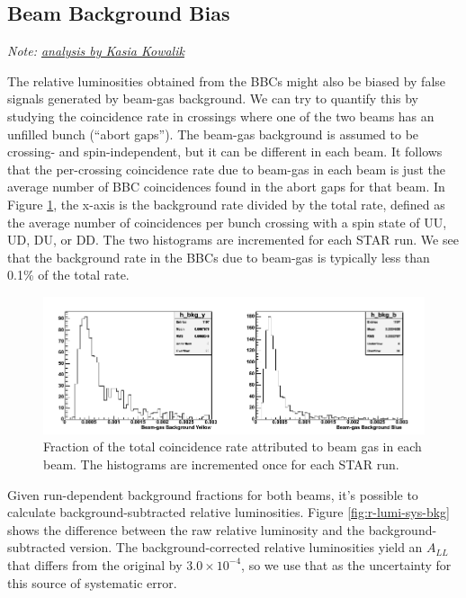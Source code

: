 \subsection{Beam Background Bias}

\textit{Note: \href{http://www.star.bnl.gov/protected/spin/kowalik/2005/r-lumi/bkg_sys.html}{analysis by Kasia Kowalik}}

The relative luminosities obtained from the BBCs might also be biased by false signals generated by beam-gas background.  We can try to quantify this by studying the coincidence rate in crossings where one of the two beams has an unfilled bunch (``abort gaps'').  The beam-gas background is assumed to be crossing- and spin-independent, but it can be different in each beam.  It follows that the per-crossing coincidence rate due to beam-gas in each beam is just the average number of BBC coincidences found in the abort gaps for that beam.  In Figure \ref{fig:bkg-yellow-blue}, the x-axis is the background rate divided by the total rate, defined as the average number of coincidences per bunch crossing with a spin state of UU, UD, DU, or DD.  The two histograms are incremented for each STAR run.  We see that the background rate in the BBCs due to beam-gas is typically less than 0.1\% of the total rate.

\begin{figure}
  \includegraphics[width=1.0\textwidth]{figures/bkg-yellow-blue}
  \caption{Fraction of the total coincidence rate attributed to beam gas in each beam.  The histograms are incremented once for each STAR run.}
  \label{fig:bkg-yellow-blue}
\end{figure}

Given run-dependent background fractions for both beams, it's possible to calculate background-subtracted relative luminosities.  Figure \ref{fig:r-lumi-sys-bkg} shows the difference between the raw relative luminosity and the background-subtracted version.  The background-corrected relative luminosities yield an $A_{LL}$ that differs from the original by $3.0\times10^{-4}$, so we use that as the uncertainty for this source of systematic error.


